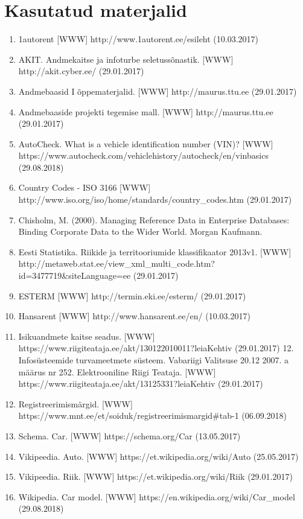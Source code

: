 \chapter{Kasutatud materjalid}
\begin{enumerate}
	\item 1autorent [WWW] http://www.1autorent.ee/esileht (10.03.2017)
	\item AKIT. Andmekaitse ja infoturbe seletussõnastik. [WWW] http://akit.cyber.ee/   (29.01.2017)
	\item Andmebaasid I õppematerjalid. [WWW] http://maurus.ttu.ee (29.01.2017)
	\item Andmebaaside projekti tegemise mall. [WWW] http://maurus.ttu.ee (29.01.2017)
	\item AutoCheck. What is a vehicle identification number (VIN)? [WWW] https://www.autocheck.com/vehiclehistory/autocheck/en/vinbasics (29.08.2018)
	\item Country Codes - ISO 3166 [WWW] http://www.iso.org/iso/home/standards/country\_codes.htm (29.01.2017)
	\item Chisholm, M. (2000). Managing Reference Data in Enterprise Databases: Binding Corporate Data to the Wider World. Morgan Kaufmann.
	\item Eesti Statistika. Riikide ja territooriumide klassifikaator 2013v1. [WWW] http://metaweb.stat.ee/view\_xml\_multi\_code.htm?id=3477719\&siteLanguage=ee (29.01.2017)
	\item ESTERM [WWW] http://termin.eki.ee/esterm/ (29.01.2017)
	\item Hansarent [WWW] http://www.hansarent.ee/en/ (10.03.2017)
	\item Isikuandmete kaitse seadus. [WWW] https://www.riigiteataja.ee/akt/130122010011?leiaKehtiv (29.01.2017)
	12.	Infosüsteemide turvameetmete süsteem. Vabariigi Valitsuse 20.12 2007. a määrus nr 252. Elektrooniline Riigi Teataja.
	[WWW] https://www.riigiteataja.ee/akt/13125331?leiaKehtiv (29.01.2017)
	\item Registreerimismärgid. [WWW] https://www.mnt.ee/et/soiduk/registreerimismargid#tab-1 (06.09.2018)
	\item Schema. Car. [WWW] https://schema.org/Car (13.05.2017)
	\item Vikipeedia. Auto. [WWW] https://et.wikipedia.org/wiki/Auto (25.05.2017)
	\item Vikipeedia. Riik. [WWW] https://et.wikipedia.org/wiki/Riik (29.01.2017) 
	\item Wikipedia. Car model. [WWW] https://en.wikipedia.org/wiki/Car\_model (29.08.2018)
\end{enumerate}